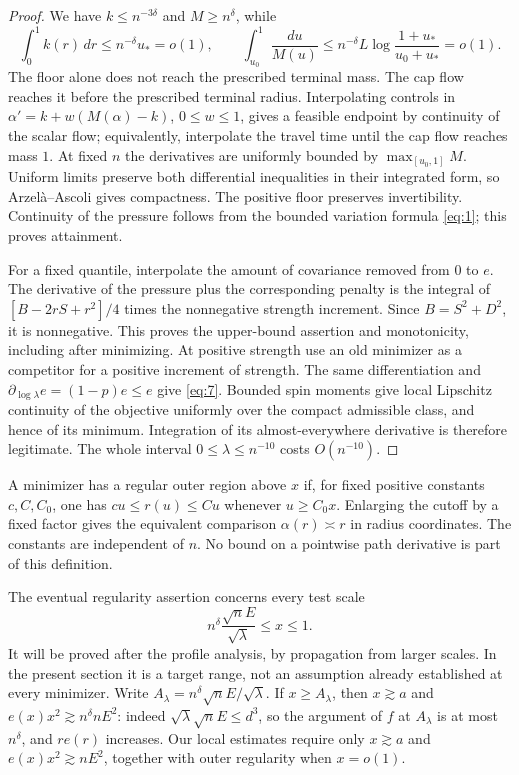 \begin{proof}
We have $k\le n^{-3\delta}$ and $M\ge n^\delta$, while
\[
 \int_0^1 k(r)\,dr\le n^{-\delta}u_* =o(1),\qquad
 \int_{u_0}^1\frac{du}{M(u)}
 \le n^{-\delta}L\log\frac{1+u_*}{u_0+u_*}=o(1).
\]
The floor alone does not reach the prescribed terminal mass.  The cap
flow reaches it before the prescribed terminal radius.  Interpolating
controls in $\alpha'=k+w(M(\alpha)-k)$, $0\le w\le1$, gives a feasible
endpoint by continuity of the scalar flow; equivalently, interpolate the
travel time until the cap flow reaches mass $1$.  At fixed $n$ the
derivatives are uniformly bounded by $\max_{[u_0,1]}M$.  Uniform limits
preserve both differential inequalities in their integrated form, so
Arzel\`a--Ascoli gives compactness.  The positive floor preserves
invertibility.  Continuity of the pressure follows from the bounded
variation formula \eqref{eq:1}; this proves attainment.

For a fixed quantile, interpolate the amount of covariance removed from
$0$ to $e$.  The derivative of the pressure plus the corresponding
penalty is the integral of $[B-2rS+r^2]/4$ times the nonnegative strength
increment.  Since $B=S^2+D^2$, it is nonnegative.  This proves the
upper-bound assertion and monotonicity, including after minimizing.
At positive strength use an old minimizer as a competitor for a positive
increment of strength.  The same differentiation and
$\partial_{\log\lambda}e=(1-p)e\le e$ give \eqref{eq:7}.
Bounded spin moments give local Lipschitz continuity of the objective
uniformly over the compact admissible class, and hence of its minimum.
Integration of its almost-everywhere derivative is therefore legitimate.
The whole interval $0\le\lambda\le n^{-10}$ costs $O(n^{-10})$.
\end{proof}

\begin{definition}\label{comp:outer-regularity}
A minimizer has a regular outer region above $x$ if, for fixed positive
constants $c,C,C_0$, one has $cu\le r(u)\le Cu$ whenever
$u\ge C_0x$.  Enlarging the cutoff by a fixed factor gives the
equivalent comparison $\alpha(r)\asymp r$ in radius coordinates.  The
constants are independent of $n$.  No bound on a pointwise path
derivative is part of this definition.
\end{definition}

The eventual regularity assertion concerns every test scale
\begin{equation}
 n^\delta\frac{\sqrt n E}{\sqrt\lambda}\le x\le1.
 \tag{8}\label{eq:8}
\end{equation}
It will be proved after the profile analysis, by propagation from larger
scales.  In the present section it is a target range, not an assumption
already established at every minimizer.  Write
$A_\lambda=n^\delta\sqrt n E/\sqrt\lambda$.
If $x\ge A_\lambda$, then $x\gtrsim a$ and
$e(x)x^2\gtrsim n^\delta nE^2$: indeed
$\sqrt\lambda\sqrt n E\le d^3$, so the argument of $f$ at
$A_\lambda$ is at most $n^\delta$, and $re(r)$ increases.
Our local estimates require only $x\gtrsim a$ and
$e(x)x^2\gtrsim nE^2$, together with outer regularity when $x=o(1)$.

